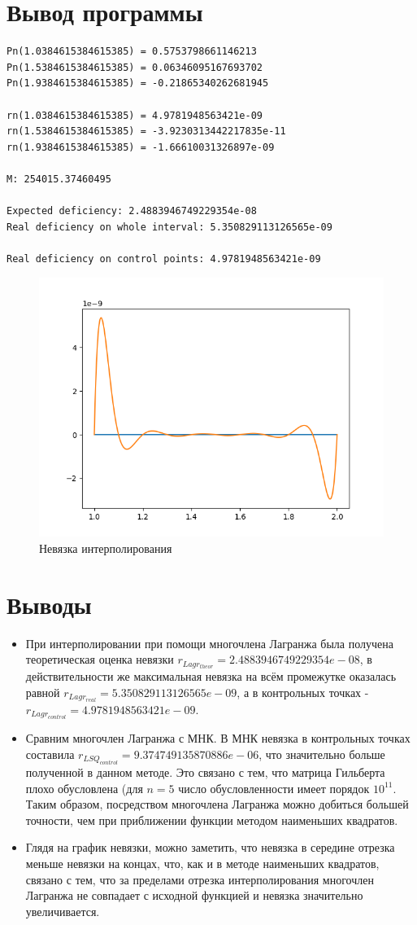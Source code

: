 \documentclass[14pt, a4paper]{article}
\begin{document}
  \section{Вывод программы}
\begin{verbatim}
Pn(1.0384615384615385) = 0.5753798661146213
Pn(1.5384615384615385) = 0.06346095167693702
Pn(1.9384615384615385) = -0.21865340262681945

rn(1.0384615384615385) = 4.9781948563421e-09
rn(1.5384615384615385) = -3.9230313442217835e-11
rn(1.9384615384615385) = -1.66610031326897e-09

M: 254015.37460495

Expected deficiency: 2.4883946749229354e-08
Real deficiency on whole interval: 5.350829113126565e-09

Real deficiency on control points: 4.9781948563421e-09
\end{verbatim}
\begin{figure}[h!]
  \center
  \includegraphics[width=0.6\linewidth]{LagrangeDiff.png}
  \caption{Невязка интерполирования}
\end{figure}

  \section{Выводы}
  \begin{itemize}
  \item
  При интерполировании при помощи многочлена Лагранжа была получена теоретическая оценка невязки $r_{Lagr_{theor}} = 2.4883946749229354e-08$, в действительности же максимальная невязка на всём промежутке оказалась равной $r_{Lagr_{real}} = 5.350829113126565e-09$, а в контрольных точках - $r_{Lagr_{control}} = 4.9781948563421e-09$.
  \item
  Сравним многочлен Лагранжа с МНК. В МНК невязка в контрольных точках составила $r_{LSQ_{control}} = 9.374749135870886e-06$, что значительно больше полученной в данном методе. Это связано с тем, что матрица Гильберта плохо обусловлена (для $n=5$ число обусловленности имеет порядок $10^{11}$. Таким образом, посредством многочлена Лагранжа можно добиться большей точности, чем при приближении функции методом наименьших квадратов.
  \item
  Глядя на график невязки, можно заметить, что невязка в середине отрезка меньше невязки на концах, что, как и в методе наименьших квадратов, связано с тем, что за пределами отрезка интерполирования многочлен Лагранжа не совпадает с исходной функцией и невязка значительно увеличивается.
  \end{itemize}
\end{document}
